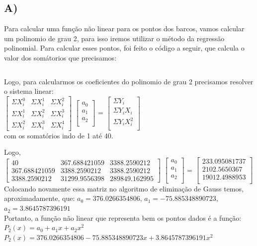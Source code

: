 \documentclass{article}
\begin{document}
    \subsection*{A)}\hspace{0.5cm}Para calcular uma função não linear para os pontos dos barcos, vamos calcular um polinomio de grau 2, para isso iremos utilizar o método da regressão polinomial. Para calcular esses pontos, foi feito o código a seguir, que calcula o valor dos somátorios que precisamos:
    \inputminted[]{python}{questao2.py}
    Logo, para calcularmos os coeficientes do polinomio de grau 2 precisamos resolver o sistema linear:\\
    $\begin{bmatrix}
        \Sigma X_i^0 & \Sigma X_i^1 & \Sigma X_i^2\\
        \Sigma X_i^1 & \Sigma X_i^2 & \Sigma X_i^3\\
        \Sigma X_i^2 & \Sigma X_i^3 & \Sigma X_i^4
    \end{bmatrix}$
    $\begin{bmatrix}
        a_0\\
        a_1\\
        a_2\\
    \end{bmatrix}$
    = $\begin{bmatrix}
        \Sigma Y_i\\
        \Sigma Y_iX_i\\
        \Sigma Y_iX_i ^2\\
    \end{bmatrix}$\\
    com os somatórios indo de 1 até 40.
    
    Logo, \\
    $\begin{bmatrix}
        40 & 367.688421059 & 3388.2590212\\
        367.688421059 & 3388.2590212 & 3388.2590212\\
        3388.2590212 & 31299.9556398 & 289849.162995
    \end{bmatrix}$
    $\begin{bmatrix}
        a_0\\
        a_1\\
        a_2\\
    \end{bmatrix}$
    = $\begin{bmatrix}
        233.095081737\\
        2102.5650367\\
        19012.4988953\\
    \end{bmatrix}$\\
    Colocando novamente essa matriz no algoritmo de eliminação de Gauss temos, aproximadamente, que:
    $a_0 = 376.0266354806$, $a_1 = -75.885348890723$, $a_2 = 3.8645787396191$\\
    Portanto, a função não linear que representa bem os pontos dados é a função:\\
    $P_2(x) = a_0 + a_1x + a_2x^2$\\
$P_2(x) = 376.0266354806 -75.885348890723x + 3.8645787396191x^2$  
\end{document}
